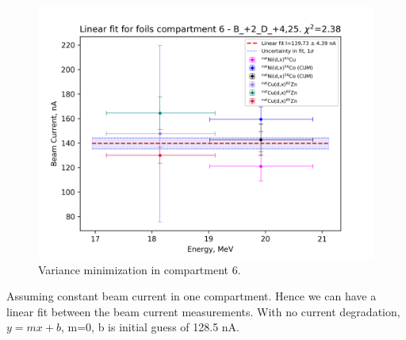 \documentclass[a4paper,11pt,twoside]{book}
\begin{document}
\begin{figure}
    \centering
    \includegraphics{Analysis/minimization_6_B_+2_D_+4,25.png}
    \caption{Variance minimization in compartment 6.}
    \label{fig:varmin_comp6}
\end{figure}

Assuming constant beam current in one compartment. Hence we can have a linear fit between the beam current measurements. With no current degradation, $y=mx+b$, m=0, b is initial guess of 128.5 nA. 
\end{document}
